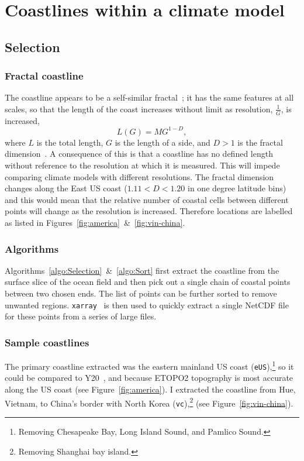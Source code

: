 

\section{Coastlines within a climate model}
\label{sec:coast}
\subsection{Selection}
 \subsubsection{Fractal coastline}
 \label{sec:fractal}
 The coastline appears to be a self-similar fractal~\cite{mandelbrot1967long,
 richardson1961problem}; it has the same features at all
 scales, so that the length of the coast increases without limit as resolution, $\frac{1}{G}$,
 is increased,
 \begin{equation}
 L(G)=M G^{1-D},
 \end{equation}
 where $L$ is the total length, $G$ is the length of a side,
 and $D>1$ is the fractal dimension~\cite{mandelbrot1967long}.
 A consequence of this is that a coastline has no defined length without
 reference to the resolution at which it is measured.
 This will impede comparing
 climate models with different resolutions.
 The fractal dimension changes
  along the East US coast ($1.11<D<1.20$ in one degree latitude bins)~\cite{jiang1998fractal}
 and this would mean that the relative number of coastal cells between different
 points will change as the resolution is increased.
 Therefore locations are labelled as listed in
 Figures~\ref{fig:america}~\&~\ref{fig:vin-china}.

\subsubsection{Algorithms}
\label{sec:coast-algorithms}
Algorithms~\ref{algo:Selection}~\&~\ref{algo:Sort} first extract the coastline
from the surface slice of the ocean field and then pick out a single chain of
coastal points between two chosen ends. The list of points can be further
sorted to remove unwanted regions.
\texttt{xarray}~\cite{hoyer2017xarray} is then used to quickly extract
a single NetCDF file for these points from a series of large files.





\subsubsection{Sample coastlines}
\label{sec:coast-sample}
The primary coastline extracted was the eastern mainland US coast (\texttt{eUS}),\footnote{
Removing Chesapeake Bay, Long Island Sound, and Pamlico Sound.
}
so it could be compared to Y20~\cite{ZannaPreprint},
and because ETOPO2 topography is most accurate along the
US coast (see Figure~\ref{fig:america}).
I extracted the coastline from Hue, Vietnam, to China's
border with North Korea (\texttt{vc}),\footnote{
Removing Shanghai bay island.} (see Figure~\ref{fig:vin-china}).


